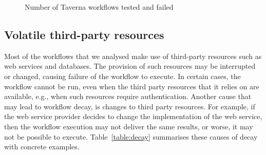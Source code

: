 \begin{figure}[h]
\centering
{}
\caption{Number of Taverna workflows tested and failed}
\label{fig:taverna-wf-failed}
\end{figure}


\subsection{Volatile third-party resources}
Most of the workflows that we analysed make use of third-party resources such as web services and databases.
The provision of such resources may be interrupted or changed, causing failure of the workflow to execute. In certain cases, the workflow cannot be run, even when the third party resources that it relies on are available, e.g.,  when such resources require authentication. Another cause that may lead to workflow decay, is changes to third party resources. For example, if the web service provider decides to change the implementation of the web service, then the workflow execution may not deliver the same results, or worse, it may not be possible to execute. Table~\ref{table:decay} summarises these causes of decay with concrete examples.


